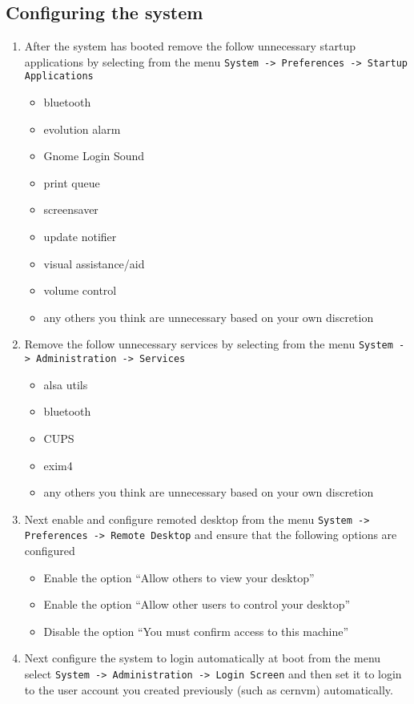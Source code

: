 \subsection{Configuring the system}
\label{sec:debianconfig}
\begin{enumerate}
\item	After the system has booted remove the follow unnecessary startup applications by selecting from the menu  
		\verb|System -> Preferences -> Startup Applications|
\begin{itemize}
\item	bluetooth
\item	evolution alarm
\item	Gnome Login Sound
\item	print queue
\item	screensaver
\item	update notifier
\item	visual assistance/aid
\item	volume control
\item	any others you think are unnecessary based on your own discretion
\end{itemize}

\item Remove the follow unnecessary services by selecting from the menu \verb|System -> Administration -> Services|
\begin{itemize}
\item	alsa utils
\item	bluetooth
\item	CUPS
\item	exim4
\item	any others you think are unnecessary based on your own discretion
\end{itemize}

\item Next enable and configure remoted desktop from the menu \verb|System -> Preferences -> Remote Desktop| and ensure
that the following options are configured
\begin{itemize}
\item	Enable the option ``Allow others to view your desktop''
\item	Enable the option ``Allow other users to control your desktop''
\item	Disable the option ``You must confirm access to this machine''
\end{itemize}

\item Next configure the system to login automatically at boot from the menu select \verb|System -> Administration -> Login Screen|
and then set it to login to the user account you created previously (such as cernvm) automatically.


\end{enumerate}
